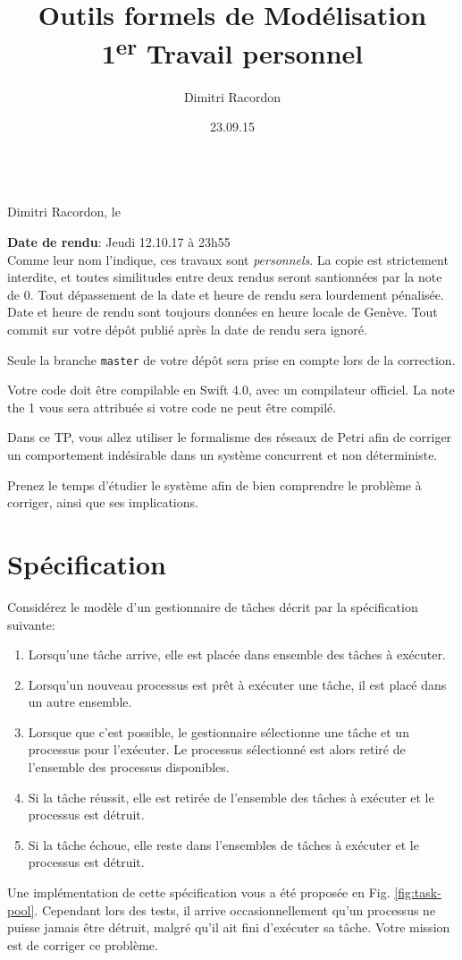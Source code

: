 \documentclass[a4paper, titlepage]{article}
\makeatletter
\numberwithin{figure}{section}
\numberwithin{table}{section}
\newcommand\deadline[1]{\def\@deadline{#1}}
\newcommand\objective[1]{\def\@objective{#1}}
\newcommand{\makecustomtitle}{%
	\begin{center}
		\huge\@title \\
		[1ex]\small Dimitri Racordon, le \@date
	\end{center}
	\begin{framed}\@deadline\end{framed}
	\begin{framed}\@objective\end{framed}
}
\makeatother
\begin{document}
  \title{Outils formels de Modélisation \\ 1\textsuperscript{er} Travail personnel}
  \author{Dimitri Racordon}
  \date{23.09.15}

	\deadline{
		\textbf{Date de rendu}: Jeudi 12.10.17 à 23h55 \\

		Comme leur nom l'indique, ces travaux sont \emph{personnels}.
		La copie est strictement interdite, et toutes similitudes entre deux rendus
		seront santionnées par la note de 0.
		Tout dépassement de la date et heure de rendu sera lourdement pénalisée.
		Date et heure de rendu sont toujours données en heure locale de Genève.
		Tout commit sur votre dépôt publié après la date de rendu sera ignoré.

    Seule la branche \texttt{master} de votre dépôt sera prise en compte
    lors de la correction.

		Votre code doit être compilable en Swift 4.0, avec un compilateur officiel.
		La note the 1 vous sera attribuée si votre code ne peut être compilé.
	}

	\objective{
    Dans ce TP, vous allez utiliser le formalisme des réseaux de Petri
    afin de corriger un comportement indésirable dans un système concurrent et non déterministe.

		Prenez le temps d'étudier le système afin de bien comprendre le problème à corriger,
    ainsi que ses implications.
	}

	\makecustomtitle

  \section{Spécification}
		Considérez le modèle d'un gestionnaire de tâches décrit par la spécification suivante:
		\begin{enumerate}
		  \item Lorsqu'une tâche arrive, elle est placée dans ensemble des tâches à exécuter.
		  \item Lorsqu'un nouveau processus est prêt à exécuter une tâche,
            il est placé dans un autre ensemble.
		  \item Lorsque que c'est possible,
            le gestionnaire sélectionne une tâche et un processus pour l'exécuter.
				    Le processus sélectionné est alors retiré de l'ensemble des processus disponibles.
		  \item Si la tâche réussit, elle est retirée de l'ensemble des tâches à exécuter
            et le processus est détruit.
		  \item Si la tâche échoue, elle reste dans l'ensembles de tâches à exécuter
            et le processus est détruit.
		\end{enumerate}
		Une implémentation de cette spécification vous a été proposée en Fig. \ref{fig:task-pool}.
		Cependant lors des tests,
    il arrive occasionnellement qu'un processus ne puisse jamais être détruit,
    malgré qu'il ait fini d'exécuter sa tâche.
		Votre mission est de corriger ce problème.
\end{document}
